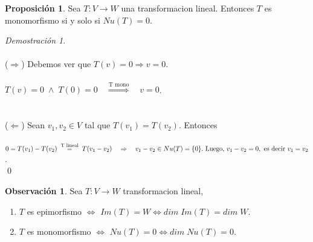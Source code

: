 \documentclass{article}
\theoremstyle{definition}
\theoremstyle{definition}
\newtheorem*{obs}{Observación}
\newtheorem{prop}[teo]{Proposición}
\theoremstyle{remark}
\newtheorem*{demo}{Demostración}
\begin{document}
\begin{prop}
Sea $T : V \to W$ una transformacion lineal. Entonces $T$ es monomorfismo si y solo si $Nu(T)=0$.
\end{prop}
\begin{demo}\; \\\\
  ($\Rightarrow$) Debemos ver que $T(v)=0\Rightarrow v = 0$. \\\\ $T(v)=0 \; \land \; T(0)=0 \quad \overset{\text{T mono}}{\Longrightarrow} \quad v =0$.\\\\\\ 
  ($\Leftarrow$) Sean $v_1, v_2 \in V$ tal que $T(v_1)=T(v_2)$. Entonces \\\\ $0=T(v_1)-T(v_2)  \overset{\text{ T lineal }}{=} T(v_1 -v_2) \quad \Rightarrow \quad v_1 -v_2 \in Nu(T)=\{0\}. \\\\\text{ Luego, }v_1 -v_2 = 0,\text{ es decir }v_1 = v_2$. \\ \qed
\end{demo}
\begin{obs}
Sea $T : V \to W$ transformacion lineal, \begin{enumerate}[label=(\arabic*)]
  \item $T$ es epimorfismo $\Leftrightarrow$ $Im(T)=W \Leftrightarrow dim \; Im(T)=dim \; W$.
  \item $T$ es monomorfismo $\Leftrightarrow$ $Nu(T)=0 \Leftrightarrow dim \;Nu(T)=0$.
  \end{enumerate}\;
\end{obs} 
\pagebreak
\end{document}
